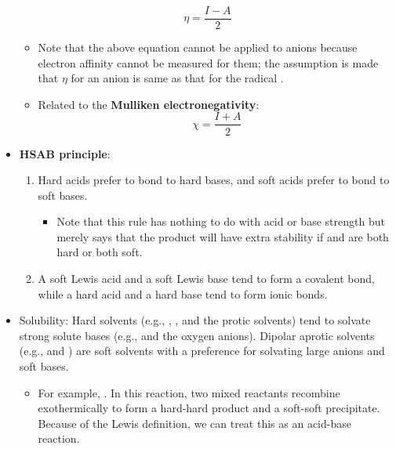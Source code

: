 \documentclass[../notes.tex]{subfiles}
\begin{document}
\begin{itemize}
\begin{equation*}
        \eta = \frac{I-A}{2}
    \end{equation*}
    \begin{itemize}
        \item Note that the above equation cannot be applied to anions because electron affinity cannot be measured for them; the assumption is made that $\eta$ for an anion  is same as that for the radical \hspace{5pt}.
        \item Related to the \textbf{Mulliken electronegativity}:
        \begin{equation*}
            \chi = \frac{I+A}{2}
        \end{equation*}
    \end{itemize}
    \item \textbf{HSAB principle}:
    \begin{enumerate}[label={(\roman*)}]
        \item Hard acids prefer to bond to hard bases, and soft acids prefer to bond to soft bases.
        \begin{itemize}
            \item Note that this rule has nothing to do with acid or base strength but merely says that the product  will have extra stability if  and  are both hard or both soft.
        \end{itemize}
        \item A soft Lewis acid and a soft Lewis base tend to form a covalent bond, while a hard acid and a hard base tend to form ionic bonds.
    \end{enumerate}
    \item Solubility: Hard solvents (e.g., , , and the protic solvents) tend to solvate strong solute bases (e.g.,  and the oxygen anions). Dipolar aprotic solvents (e.g.,  and ) are soft solvents with a preference for solvating large anions and soft bases.
    \begin{itemize}
        \item For example, . In this reaction, two mixed reactants recombine exothermically to form a hard-hard product and a soft-soft precipitate. Because of the Lewis definition, we can treat this as an acid-base reaction.
        \begin{table}[h!]
            \centering
            \small
            \renewcommand{\arraystretch}{1.4}
            \begin{tabular}{cl|cccc}

\end{tabular}
\end{table}
\end{itemize}
\end{itemize}
\end{document}
